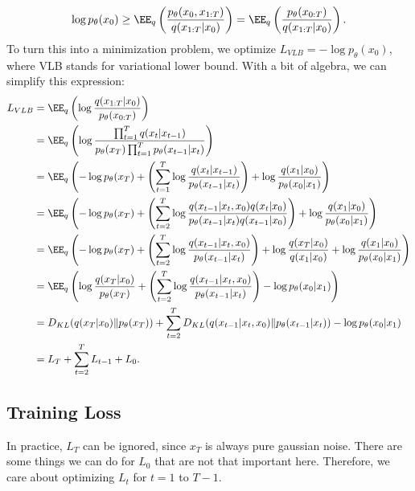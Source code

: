 \begin{align*}
	\log p_{\theta}(x_0) \geq \EE_q\left(\frac{p_{\theta}(x_0,x_{1:T})}{q(x_{1:T}|x_0)}\right) = \EE_q\left(\frac{p_{\theta}(x_{0:T})}{q(x_{1:T}|x_0)}\right). 
\end{align*}
To turn this into a minimization problem, we optimize $L_{VLB} = -\log p_{\theta}(x_0)$, where VLB stands for variational lower bound. With a bit of algebra, we can simplify this expression:
\begin{align*}
	L_{VLB} &= \EE_q\left(\log \frac{q(x_{1:T}|x_0)}{p_{\theta}(x_{0:T})}\right) \\
					&= \EE_q\left(\log \frac{\prod_{t=1}^T q(x_t|x_{t-1})}{p_{\theta}(x_T)\prod_{t=1}^Tp_{\theta}(x_{t-1}|x_t)}\right) \\
					&= \EE_q\left(-\log p_{\theta}(x_T) + \left(\sum_{t=1}^T \log \frac{q(x_t|x_{t-1})}{p_{\theta}(x_{t-1}|x_t)}\right) + \log \frac{q(x_1|x_0)}{p_{\theta}(x_0|x_1)}\right) \\
					&= \EE_q \left(-\log p_{\theta}(x_T) + \left(\sum_{t=2}^T \log \frac{q(x_{t-1}|x_t,x_0)q(x_t|x_0)}{p_{\theta}(x_{t-1}|x_t)q(x_{t-1}|x_0)}\right) + \log \frac{q(x_1|x_0)}{p_{\theta}(x_0|x_1)}\right) \\
					&= \EE_q \left(-\log p_{\theta}(x_T) + \left(\sum_{t=2}^T \log \frac{q(x_{t-1}|x_t,x_0)}{p_{\theta}(x_{t-1}|x_t)}\right) + \log \frac{q(x_T|x_0)}{q(x_1|x_0)} + \log \frac{q(x_1|x_0)}{p_{\theta}(x_0|x_1)}\right) \\
					&= \EE_q \left(\log \frac{q(x_T|x_0)}{p_{\theta}(x_T)} + \left(\sum_{t=2}^T \log \frac{q(x_{t-1}|x_t,x_0)}{p_{\theta}(x_{t-1}|x_t)}\right) - \log p_{\theta}(x_0|x_1)\right) \\
					&= D_{KL}(q(x_T|x_0)\Vert p_{\theta}(x_T)) + \sum_{t=2}^T D_{KL}(q(x_{t-1}|x_t,x_0)\Vert p_{\theta}(x_{t-1}|x_t)) - \log p_{\theta}(x_0|x_1) \\
					&= L_T + \sum_{t=2}^T L_{t-1} + L_0.
\end{align*}

\subsection{Training Loss}

In practice, $L_T$ can be ignored, since $x_T$ is always pure gaussian noise. There are some things we can do for $L_0$ that are not that important here. Therefore, we care about optimizing $L_t$ for $t=1$ to $T-1$.  

